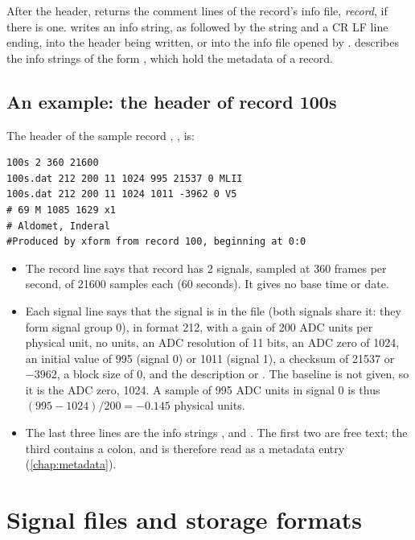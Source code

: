 After the header,  returns the comment lines of the record's info
file, \emph{record}, if there is one.  writes an
info string, as \code{\#} followed by the string and a CR LF line ending,
into the header being written, or into the info file opened by
.  describes the info strings of the form
, which hold the metadata of a record.

\subsection{An example: the header of record 100s}

The header of the sample record , , is:
\begin{lstlisting}[style=text]
100s 2 360 21600
100s.dat 212 200 11 1024 995 21537 0 MLII
100s.dat 212 200 11 1024 1011 -3962 0 V5
# 69 M 1085 1629 x1
# Aldomet, Inderal
#Produced by xform from record 100, beginning at 0:0
\end{lstlisting}
\begin{itemize}
\item The record line says that record  has 2 signals, sampled at
  360 frames per second, of 21600 samples each (60 seconds). It gives no
  base time or date.
\item Each signal line says that the signal is in the file
   (both signals share it: they form signal group 0), in
  format 212, with a gain of 200 ADC units per physical unit, no units, an
  ADC resolution of 11 bits, an ADC zero of 1024, an initial value of 995
  (signal 0) or 1011 (signal 1), a checksum of 21537 or $-3962$, a block
  size of 0, and the description  or . The baseline is
  not given, so it is the ADC zero, 1024. A sample of 995 ADC units in
  signal 0 is thus $(995 - 1024)/200 = -0.145$ physical units.
\item The last three lines are the info strings
  ,  and
  . The first
  two are free text; the third contains a colon, and is therefore read as a
  metadata entry (\cref{chap:metadata}).
\end{itemize}

\section{Signal files and storage formats}
\label{sec:signal-files}

